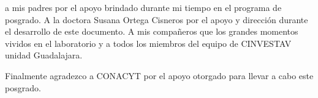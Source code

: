 
 a mis padres por el apoyo brindado durante mi tiempo en el programa de posgrado. A la doctora Susana Ortega Cisneros por el apoyo y dirección durante el desarrollo de este documento. A mis compañeros que los grandes momentos vividos en el laboratorio y a todos los miembros del equipo de CINVESTAV unidad Guadalajara.

Finalmente agradezco a CONACYT por el apoyo otorgado para llevar a cabo este posgrado.